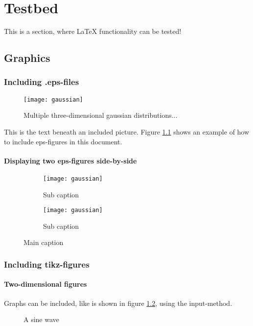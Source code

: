 \chapter[Testbed]{Testbed}
\label{chap:Testbed}
This is a section, where LaTeX functionality can be tested!
\section{Graphics}
\subsection{Including .eps-files}

\begin{figure}[H]
\centering
\texttt{[image: gaussian]}
\caption{Multiple three-dimensional gaussian distributions...}
\label{fig:mog}
\end{figure}


This is the text beneath an included picture. Figure \ref{fig:mog} shows an example of how to include eps-figures in this document.

\subsubsection{Displaying two eps-figures side-by-side}
\begin{figure}[H]
 \centering
 \begin{subfigure}{0.49\textwidth}
    \texttt{[image: gaussian]}
    \caption{Sub caption}
 \end{subfigure}
 \begin{subfigure}{0.49\textwidth}
    \texttt{[image: gaussian]}
    \caption{Sub caption}
 \end{subfigure}
 \caption{Main caption}
\end{figure}

\subsection{Including tikz-figures}
\subsubsection{Two-dimensional figures}
Graphs can be included, like is shown in figure \ref{fig:sin}, using the input-method.
\begin{figure}[H]
	\centering
	
	\caption{A sine wave}
	\label{fig:sin}
\end{figure}

